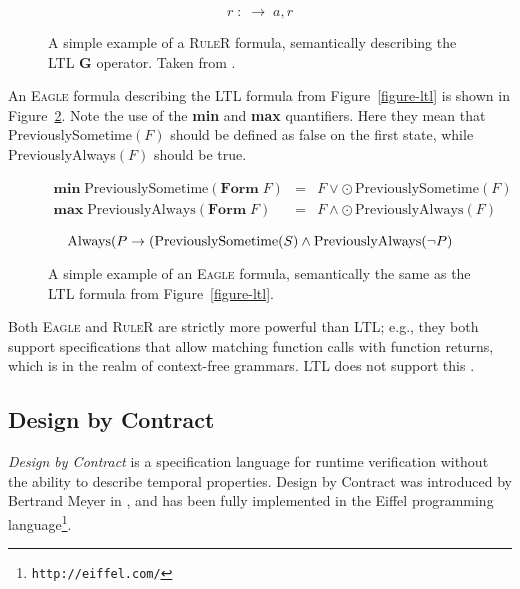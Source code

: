 \documentclass[a4paper,11pt]{kth-mag}
\theoremstyle{definition}
\begin{document}
\begin{figure}[h!]
	\[
    r \; : \; \rightarrow \; a,r
	\]

	\caption{A simple example of a \textsc{RuleR} formula, semantically describing the
  LTL $\boldsymbol{G}$ operator. Taken from \cite{barringer07ruler}.}
	\label{figure-ruler-always}
\end{figure}

An \textsc{Eagle} formula describing the LTL formula from
Figure~\ref{figure-ltl} is shown in Figure~\ref{figure-eagle-ltl}. Note the use
of the \textbf{min} and \textbf{max} quantifiers. Here they mean that
PreviouslySometime$(F)$ should be defined as false on the first state, while
PreviouslyAlways$(F)$ should be true.


\begin{figure}[h!]
  \[
  \begin{array}{rcl}
    \textbf{min} \; \text{PreviouslySometime}(\textbf{Form} \; F) & = & F \vee \odot \, \text{PreviouslySometime}(F) \\
      \textbf{max} \; \text{PreviouslyAlways}(\textbf{Form} \; F) & = & F \wedge \odot \, \text{PreviouslyAlways}(F) \\
  \end{array}
  \]
  \[
    \text{Always}(P \rightarrow (\text{PreviouslySometime}(S) \wedge \text{PreviouslyAlways}(\neg P) \\
  \]

	\caption{A simple example of an \textsc{Eagle} formula, semantically the same as the
  LTL formula from Figure~\ref{figure-ltl}.}
	\label{figure-eagle-ltl}
\end{figure}

Both \textsc{Eagle} and \textsc{RuleR} are strictly more powerful than LTL;
e.g., they both support specifications that allow matching function calls with
function returns, which is in the realm of context-free grammars. LTL does not
support this \cite{barringer03eagle,barringer07ruler}.


\subsection{Design by Contract}

\textit{Design by Contract} is a specification language for runtime
verification without the ability to describe temporal properties. Design by
Contract was introduced by Bertrand Meyer in \cite{meyer92applyingdbc}, and has
been fully implemented in the Eiffel programming
language\footnote{\texttt{http://eiffel.com/}}.
\end{document}
